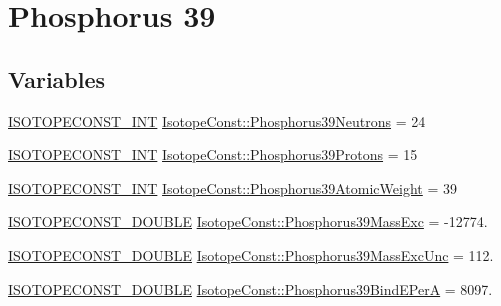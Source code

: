 \hypertarget{group___isotope_const-_phosphorus-_p39}{}\section{Phosphorus 39}
\label{group___isotope_const-_phosphorus-_p39}
\subsection*{Variables}
\begin{DoxyCompactItemize}
\item 
\mbox{\hyperlink{group___isotope_const-_macros_ga5f18360b3e99483a35c32d789e62621c}{I\+S\+O\+T\+O\+P\+E\+C\+O\+N\+S\+T\+\_\+\+I\+NT}} \mbox{\hyperlink{group___isotope_const-_phosphorus-_p39_ga2289a70cf097d4042fb661520872023b}{Isotope\+Const\+::\+Phosphorus39\+Neutrons}} = 24
\item 
\mbox{\hyperlink{group___isotope_const-_macros_ga5f18360b3e99483a35c32d789e62621c}{I\+S\+O\+T\+O\+P\+E\+C\+O\+N\+S\+T\+\_\+\+I\+NT}} \mbox{\hyperlink{group___isotope_const-_phosphorus-_p39_ga99b6e3ddf901b2af808fcbdea6e00a1e}{Isotope\+Const\+::\+Phosphorus39\+Protons}} = 15
\item 
\mbox{\hyperlink{group___isotope_const-_macros_ga5f18360b3e99483a35c32d789e62621c}{I\+S\+O\+T\+O\+P\+E\+C\+O\+N\+S\+T\+\_\+\+I\+NT}} \mbox{\hyperlink{group___isotope_const-_phosphorus-_p39_ga41d8ab8dd52d18372e84577f69b89841}{Isotope\+Const\+::\+Phosphorus39\+Atomic\+Weight}} = 39
\item 
\mbox{\hyperlink{group___isotope_const-_macros_ga8f45a7272ce02c0b4c65c44636ed719a}{I\+S\+O\+T\+O\+P\+E\+C\+O\+N\+S\+T\+\_\+\+D\+O\+U\+B\+LE}} \mbox{\hyperlink{group___isotope_const-_phosphorus-_p39_ga4642e54bb754176fc7d0db8594692b37}{Isotope\+Const\+::\+Phosphorus39\+Mass\+Exc}} = -\/12774.
\item 
\mbox{\hyperlink{group___isotope_const-_macros_ga8f45a7272ce02c0b4c65c44636ed719a}{I\+S\+O\+T\+O\+P\+E\+C\+O\+N\+S\+T\+\_\+\+D\+O\+U\+B\+LE}} \mbox{\hyperlink{group___isotope_const-_phosphorus-_p39_ga1d7fcbb83f69faf10091250dcd905fab}{Isotope\+Const\+::\+Phosphorus39\+Mass\+Exc\+Unc}} = 112.
\item 
\mbox{\hyperlink{group___isotope_const-_macros_ga8f45a7272ce02c0b4c65c44636ed719a}{I\+S\+O\+T\+O\+P\+E\+C\+O\+N\+S\+T\+\_\+\+D\+O\+U\+B\+LE}} \mbox{\hyperlink{group___isotope_const-_phosphorus-_p39_gaef11cde5dd7e0d20d37926b52b0ccd9b}{Isotope\+Const\+::\+Phosphorus39\+Bind\+E\+PerA}} = 8097.
\item 

\end{DoxyCompactItemize}
